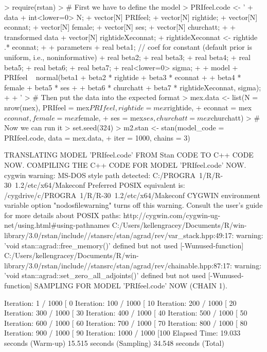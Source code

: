 \documentclass[12pt]{article}
\begin{document}
\begin{enumerate}
\begin{Schunk}
\begin{Sinput}
> require(rstan)
> # First we have to define the model
> PRIfeel.code <- '
+     data {
+         int<lower=0> N;
+         vector[N] PRIfeel;
+         vector[N] rightide;
+         vector[N] econnat;
+         vector[N] female;
+         vector[N] ses;
+         vector[N] churchatt;
+     }
+     transformed data {
+         vector[N] rightideXeconnat;
+         rightideXeconnat <- rightide .* econnat;
+     }
+     parameters {                
+         real beta1;             // coef for constant (default prior is uniform, i.e., noninformative)
+         real beta2;             
+         real beta3;
+         real beta4;
+         real beta5;
+         real beta6;
+         real beta7;
+         real<lower=0> sigma;
+     }
+     model {
+         PRIfeel ~ normal(beta1 + beta2 * rightide + beta3 * econnat +
+                              beta4 * female + beta5 * ses +
+                              beta6 * churchatt + beta7 * rightideXeconnat, sigma);
+     }
+ '
> # Then put the data into the expected format
> mex.data <- list(N = nrow(mex), PRIfeel = mex$PRIfeel, rightide = mex$rightide,
+                    econnat = mex$econnat, female = mex$female, 
+                    ses = mex$ses, churchatt = mex$churchatt)
> # Now we can run it
> set.seed(324)
> m2.stan <- stan(model_code = PRIfeel.code, data = mex.data, 
+                 iter = 1000, chains = 3)
\end{Sinput}
\begin{Soutput}
TRANSLATING MODEL 'PRIfeel.code' FROM Stan CODE TO C++ CODE NOW.
COMPILING THE C++ CODE FOR MODEL 'PRIfeel.code' NOW.
cygwin warning:
  MS-DOS style path detected: C:/PROGRA~1/R/R-30~1.2/etc/x64/Makeconf
  Preferred POSIX equivalent is: /cygdrive/c/PROGRA~1/R/R-30~1.2/etc/x64/Makeconf
  CYGWIN environment variable option "nodosfilewarning" turns off this warning.
  Consult the user's guide for more details about POSIX paths:
    http://cygwin.com/cygwin-ug-net/using.html#using-pathnames
C:/Users/kellengracey/Documents/R/win-library/3.0/rstan/include//stansrc/stan/agrad/rev/var_stack.hpp:49:17: warning: 'void stan::agrad::free_memory()' defined but not used [-Wunused-function]
C:/Users/kellengracey/Documents/R/win-library/3.0/rstan/include//stansrc/stan/agrad/rev/chainable.hpp:87:17: warning: 'void stan::agrad::set_zero_all_adjoints()' defined but not used [-Wunused-function]
SAMPLING FOR MODEL 'PRIfeel.code' NOW (CHAIN 1).

Iteration:   1 / 1000 [  0%
Iteration: 100 / 1000 [ 10%
Iteration: 200 / 1000 [ 20%
Iteration: 300 / 1000 [ 30%
Iteration: 400 / 1000 [ 40%
Iteration: 500 / 1000 [ 50%
Iteration: 600 / 1000 [ 60%
Iteration: 700 / 1000 [ 70%
Iteration: 800 / 1000 [ 80%
Iteration: 900 / 1000 [ 90%
Iteration: 1000 / 1000 [100%
Elapsed Time: 19.033 seconds (Warm-up)
              15.515 seconds (Sampling)
              34.548 seconds (Total)


\end{Soutput}
\end{Schunk}
\end{enumerate}
\end{document}
